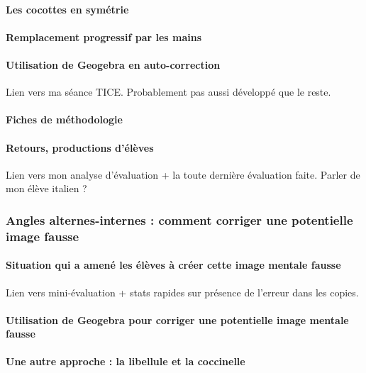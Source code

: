 \paragraph{Les cocottes en symétrie}

\paragraph{Remplacement progressif par les mains}

\paragraph{Utilisation de Geogebra en auto-correction}

Lien vers ma séance TICE. Probablement pas aussi développé que le reste.

\paragraph{Fiches de méthodologie}

\paragraph{Retours, productions d'élèves}

Lien vers mon analyse d'évaluation + la toute dernière évaluation faite. Parler de mon élève italien ?

\subsubsection{Angles alternes-internes : comment corriger une potentielle image fausse}

\paragraph{Situation qui a amené les élèves à créer cette image mentale fausse}

Lien vers mini-évaluation + stats rapides sur présence de l'erreur dans les copies.

\paragraph{Utilisation de Geogebra pour corriger une potentielle image mentale fausse}

\paragraph{Une autre approche : la libellule et la coccinelle}

